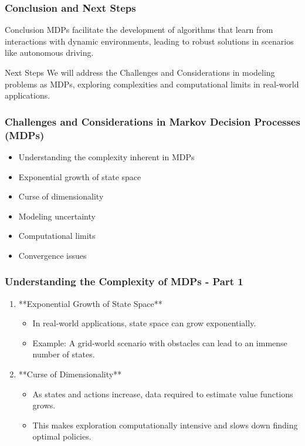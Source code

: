\documentclass[aspectratio=169]{beamer}
\begin{document}
\begin{frame}[fragile]
    \frametitle{Conclusion and Next Steps}
    \begin{block}{Conclusion}
        MDPs facilitate the development of algorithms that learn from interactions with dynamic environments, leading to robust solutions in scenarios like autonomous driving.
    \end{block}
    
    \begin{block}{Next Steps}
        We will address the Challenges and Considerations in modeling problems as MDPs, exploring complexities and computational limits in real-world applications.
    \end{block}
\end{frame}

\begin{frame}[fragile]
    \frametitle{Challenges and Considerations in Markov Decision Processes (MDPs)}
    \begin{itemize}
        \item Understanding the complexity inherent in MDPs
        \item Exponential growth of state space
        \item Curse of dimensionality
        \item Modeling uncertainty
        \item Computational limits
        \item Convergence issues
    \end{itemize}
\end{frame}

\begin{frame}[fragile]
    \frametitle{Understanding the Complexity of MDPs - Part 1}
    \begin{enumerate}
        \item **Exponential Growth of State Space**
        \begin{itemize}
            \item In real-world applications, state space can grow exponentially.
            \item Example: A grid-world scenario with obstacles can lead to an immense number of states.
        \end{itemize}

        \item **Curse of Dimensionality**
        \begin{itemize}
            \item As states and actions increase, data required to estimate value functions grows.
            \item This makes exploration computationally intensive and slows down finding optimal policies.
        \end{itemize}
    \end{enumerate}
\end{frame}
\end{document}
